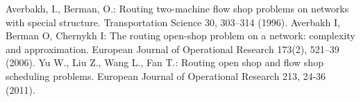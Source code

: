 \begin{thebibliography}{1}
\providecommand{\url}[1]{\texttt{#1}}
\providecommand{\urlprefix}{URL }

Averbakh, I., Berman, O.:  Routing two-machine flow shop problems on networks with special structure. Transportation Science 30, 303--314 (1996).
Averbakh I, Berman O, Chernykh I: The routing open-shop problem on a network: complexity and approximation. European Journal of Operational Research 173(2), 521--39 (2006).
Yu W., Liu Z., Wang L., Fan T.: Routing open shop and flow shop scheduling problems. European Journal of Operational Research 213, 24-36 (2011).


\end{thebibliography}
